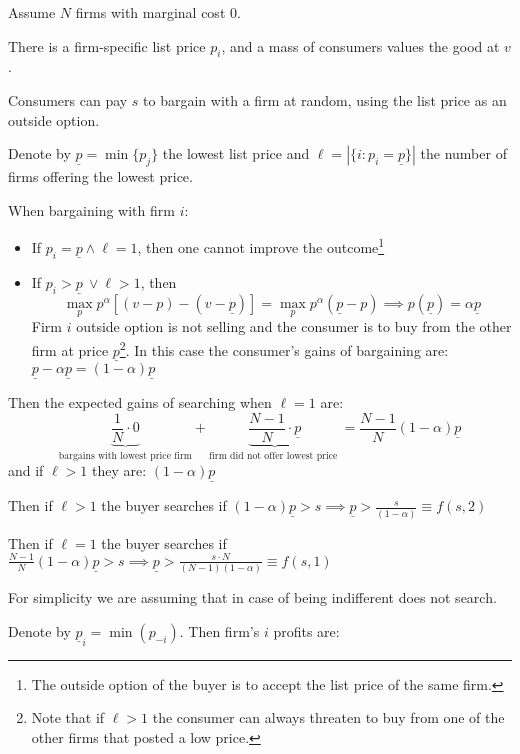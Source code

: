 \documentclass[12pt]{article}
\theoremstyle{plain}
\theoremstyle{plain}
\begin{document}
Assume $N$ firms with marginal cost $0$.

There is a firm-specific list price $p_i$, and a mass of consumers values the good at $v$.

Consumers can pay $s$ to bargain with a firm at random, using the list price as an outside option.



Denote by $\underline{p} = \min\{p_j\}$  the lowest list price and $\ell = |\{i: p_i = \underline{p}\}|$ the number of firms offering the lowest price. 


When bargaining with firm $i$:
\begin{itemize}
    \item If $p_i = \underline{p}  \land \ell =1 $, then one cannot improve the outcome\footnote{The outside option of the buyer is to accept the list price of the same firm.}
    
    \item If $p_i >  \underline{p} \ \lor \ell > 1  $, then
    \[
    \max_{p} p^\alpha [(v - p) - (v - \underline{p} )] = \max_{p} p^\alpha (\underline{p}  - p) \implies p(\underline{p} ) = \alpha \underline{p} 
    \]
    Firm $i$ outside option is not selling and the consumer is to buy from the other firm at price $\underline{p} $\footnote{Note that if $\ell > 1$  the consumer can always threaten to buy from one of the other firms that posted a low price.}. In this case the consumer's gains of bargaining are:  $\underline{p} - \alpha \underline{p}  = (1-\alpha) \underline{p} $
\end{itemize}

Then the expected gains of searching when $\ell =1$ are:
\[
\underbrace{\frac{1}{N} \cdot 0}_{\text{bargains with lowest price firm}} + \underbrace{\frac{N - 1}{N} \cdot \underline{p}}_{\text{firm did not offer lowest price }} = \frac{N - 1}{N}(1 - \alpha)\underline{p}
\]
and if $\ell> 1$ they are:  $ (1 - \alpha)\underline{p} $

Then if $\ell>1$ the buyer searches if $ (1 - \alpha)\underline{p}>s \implies \underline{p}>  \frac{s}{(1-\alpha)}\equiv f(s,2)$

Then if $\ell = 1$ the buyer searches if $ \frac{N - 1}{N}(1 - \alpha)\underline{p}>s \implies \underline{p}>  \frac{s\cdot N}{(N-1)(1-\alpha)}\equiv f(s,1)$

For simplicity we are assuming that in case of being indifferent does not search. 

Denote by $\underline{p}_i = \min(p_{-i})$. Then firm's $i$ profits are: 
\end{document}
